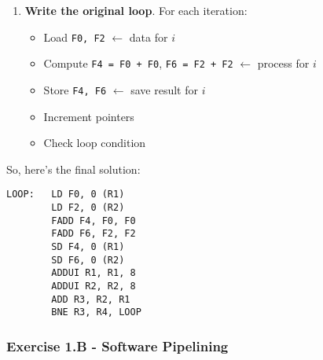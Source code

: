 \begin{enumerate}
    \item \textbf{Write the original loop}. For each iteration:
    \begin{itemize}
        \item Load \texttt{F0, F2} $\leftarrow$ data for $i$
        \item Compute \texttt{F4 = F0 + F0}, \texttt{F6 = F2 + F2} $\leftarrow$ process for $i$
        \item Store \texttt{F4, F6} $\leftarrow$ save result for $i$
        \item Increment pointers
        \item Check loop condition
    \end{itemize}
\end{enumerate}
So, here's the final solution:
\begin{lstlisting}
LOOP:   LD F0, 0 (R1)
        LD F2, 0 (R2)
        FADD F4, F0, F0
        FADD F6, F2, F2
        SD F4, 0 (R1)
        SD F6, 0 (R2)
        ADDUI R1, R1, 8
        ADDUI R2, R2, 8
        ADD R3, R2, R1
        BNE R3, R4, LOOP
\end{lstlisting}

\newpage

\subsubsection*{Exercise 1.B - Software Pipelining}

